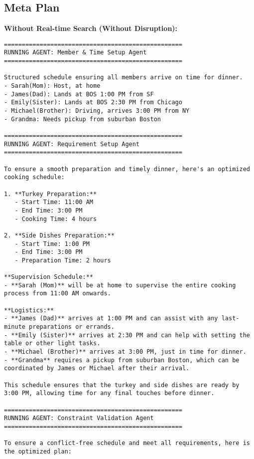 \subsection{Meta Plan}
\textbf{Without Real-time Search (Without Disruption):}
\begin{lstlisting}[style=JSONStyle, caption=Sample JSON Output from Agent Pipeline, label=lst:data_collection]
==================================================
RUNNING AGENT: Member & Time Setup Agent
==================================================

Structured schedule ensuring all members arrive on time for dinner. 
- Sarah(Mom): Host, at home
- James(Dad): Lands at BOS 1:00 PM from SF
- Emily(Sister): Lands at BOS 2:30 PM from Chicago
- Michael(Brother): Driving, arrives 3:00 PM from NY
- Grandma: Needs pickup from suburban Boston

==================================================
RUNNING AGENT: Requirement Setup Agent
==================================================

To ensure a smooth preparation and timely dinner, here's an optimized cooking schedule:

1. **Turkey Preparation:**
   - Start Time: 11:00 AM
   - End Time: 3:00 PM
   - Cooking Time: 4 hours

2. **Side Dishes Preparation:**
   - Start Time: 1:00 PM
   - End Time: 3:00 PM
   - Preparation Time: 2 hours

**Supervision Schedule:**
- **Sarah (Mom)** will be at home to supervise the entire cooking process from 11:00 AM onwards.

**Logistics:**
- **James (Dad)** arrives at 1:00 PM and can assist with any last-minute preparations or errands.
- **Emily (Sister)** arrives at 2:30 PM and can help with setting the table or other light tasks.
- **Michael (Brother)** arrives at 3:00 PM, just in time for dinner.
- **Grandma** requires a pickup from suburban Boston, which can be coordinated by James or Michael after their arrival.

This schedule ensures that the turkey and side dishes are ready by 3:00 PM, allowing time for any final touches before dinner.

==================================================
RUNNING AGENT: Constraint Validation Agent
==================================================

To ensure a conflict-free schedule and meet all requirements, here is the optimized plan:


\end{lstlisting}
